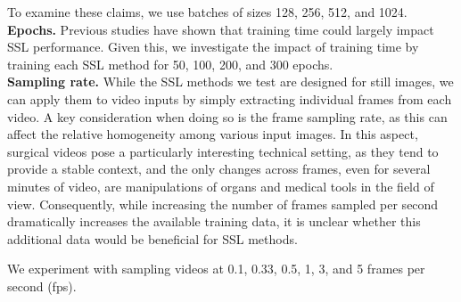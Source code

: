 \documentclass[times,twocolumn,final]{elsarticle}
\begin{document}
To examine these claims, we use batches of sizes 128, 256, 512, and 1024.
\\
\noindent\textbf{Epochs.}
Previous studies have shown that training time could largely impact SSL performance. Given this, we investigate the impact of training time by training each SSL method for 50, 100, 200, and 300 epochs.
\\
\noindent\textbf{Sampling rate.}
While the SSL methods we test are designed for still images, we can apply them to video inputs by simply extracting individual frames from each video.
A key consideration when doing so is the frame sampling rate, as this can affect the relative homogeneity among various input images. 
In this aspect, surgical videos pose a particularly interesting technical setting, as they tend to provide a stable context, and the only changes across frames, even for several minutes of video, are manipulations of organs and medical tools in the field of view.  
Consequently, while increasing the number of frames sampled per second dramatically increases the available training data, it is unclear whether this additional data would be beneficial for SSL methods.

We experiment with sampling videos at 0.1, 0.33, 0.5, 1, 3, and 5 frames per second (fps). 
\end{document}

